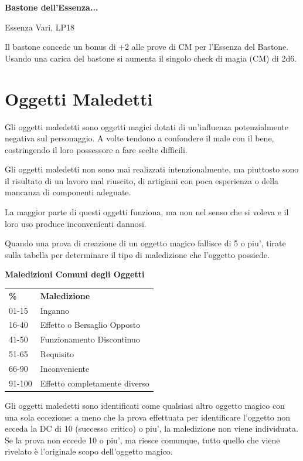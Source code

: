 \documentclass[a4paper,11pt,twoside,openany]{book}
\begin{document}
\textbf{Bastone dell'Essenza...}

Essenza Vari, LP18

Il bastone concede un bonus di +2 alle prove di CM per l'Essenza del Bastone. Usando una carica del bastone si aumenta il singolo check di magia (CM) di 2d6.

\pagebreak

\section{Oggetti Maledetti}

\label{oggetti-maledetti}

Gli oggetti maledetti sono oggetti magici dotati di un'influenza potenzialmente negativa sul personaggio. A volte tendono a confondere il male con il bene, costringendo il loro possessore a fare scelte difficili.

Gli oggetti maledetti non sono mai realizzati intenzionalmente, ma piuttosto sono il risultato di un lavoro mal riuscito, di artigiani con poca esperienza o della mancanza di componenti adeguate.

La maggior parte di questi oggetti funziona, ma non nel senso che si voleva e il loro uso produce inconvenienti dannosi.

Quando una prova di creazione di un oggetto magico fallisce di 5 o piu', tirate sulla tabella per determinare il tipo di maledizione che l'oggetto possiede.

\bigskip

\textbf{Maledizioni Comuni degli Oggetti}

\medskip
\begin{tabular}{L{3.5cm} L{6cm}}
	\toprule
	\textbf{\%} & \textbf{Maledizione}\\
	01-15       & Inganno\\
	16-40       & Effetto o Bersaglio Opposto\\
	41-50       & Funzionamento Discontinuo\\
	51-65       & Requisito\\
	66-90       & Inconveniente\\
	91-100      & Effetto completamente diverso\\
\end{tabular}

\bigskip

Gli oggetti maledetti sono identificati come qualsiasi altro oggetto magico con una sola eccezione: a meno che la prova effettuata per identificare l'oggetto non ecceda la DC di 10 (successo critico) o piu', la maledizione non viene individuata. Se la prova non eccede 10 o piu', ma riesce comunque, tutto quello che viene rivelato è l'originale scopo dell'oggetto magico.
\end{document}
